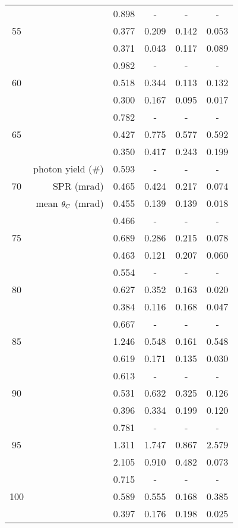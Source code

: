 \begin{longtable}{|crcccc|}
\multirow{3}{*}{55} &  & 0.898 & - & - & - \\* 
	 &  & 0.377 & 0.209 & 0.142 & 0.053 \\* 
	 &  & 0.371 & 0.043 & 0.117 & 0.089 \\ \hline 
\multirow{3}{*}{60} &  & 0.982 & - & - & - \\* 
	 &  & 0.518 & 0.344 & 0.113 & 0.132 \\* 
	 &  & 0.300 & 0.167 & 0.095 & 0.017 \\ \hline 
\multirow{3}{*}{65} &  & 0.782 & - & - & - \\* 
	 &  & 0.427 & 0.775 & 0.577 & 0.592 \\* 
	 &  & 0.350 & 0.417 & 0.243 & 0.199 \\ \hline 
\multirow{3}{*}{70} & photon yield (\#) & 0.593 & - & - & - \\* 
	 & SPR (mrad) & 0.465 & 0.424 & 0.217 & 0.074 \\* 
	 & mean $\theta_{C}$ (mrad) & 0.455 & 0.139 & 0.139 & 0.018 \\ \hline 
\multirow{3}{*}{75} &  & 0.466 & - & - & - \\* 
	 &  & 0.689 & 0.286 & 0.215 & 0.078 \\* 
	 &  & 0.463 & 0.121 & 0.207 & 0.060 \\ \hline 
\multirow{3}{*}{80} &  & 0.554 & - & - & - \\* 
	 &  & 0.627 & 0.352 & 0.163 & 0.020 \\* 
	 &  & 0.384 & 0.116 & 0.168 & 0.047 \\ \hline 
\multirow{3}{*}{85} &  & 0.667 & - & - & - \\* 
	 &  & 1.246 & 0.548 & 0.161 & 0.548 \\* 
	 &  & 0.619 & 0.171 & 0.135 & 0.030 \\ \hline 
\multirow{3}{*}{90} &  & 0.613 & - & - & - \\* 
	 &  & 0.531 & 0.632 & 0.325 & 0.126 \\* 
	 &  & 0.396 & 0.334 & 0.199 & 0.120 \\ \hline 
\multirow{3}{*}{95} &  & 0.781 & - & - & - \\* 
	 &  & 1.311 & 1.747 & 0.867 & 2.579 \\* 
	 &  & 2.105 & 0.910 & 0.482 & 0.073 \\ \hline 
\multirow{3}{*}{100} &  & 0.715 & - & - & - \\* 
	 &  & 0.589 & 0.555 & 0.168 & 0.385 \\* 
	 &  & 0.397 & 0.176 & 0.198 & 0.025 \\ \hline 

\end{longtable}
